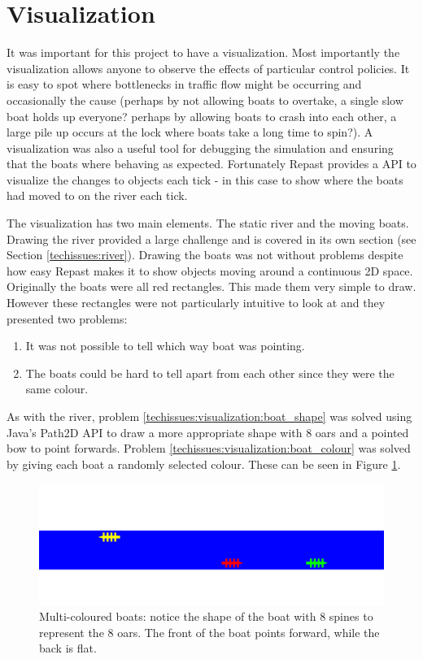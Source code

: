     \section{Visualization}
      It was important for this project to have a visualization. Most importantly the visualization allows anyone to observe the effects of particular control policies. It is easy to spot where bottlenecks in traffic flow might be occurring and occasionally the cause (perhaps by not allowing boats to overtake, a single slow boat holds up everyone? perhaps by allowing boats to crash into each other, a large pile up occurs at the lock where boats take a long time to spin?). A visualization was also a useful tool for debugging the simulation and ensuring that the boats where behaving as expected. Fortunately Repast provides a API to visualize the changes to objects each tick - in this case to show where the boats had moved to on the river each tick.

      The visualization has two main elements. The static river and the moving boats. Drawing the river provided a large challenge and is covered in its own section (see Section \ref{techissues:river}). Drawing the boats was not without problems despite how easy Repast makes it to show objects moving around a continuous 2D space. Originally the boats were all red rectangles. This made them very simple to draw. However these rectangles were not particularly intuitive to look at and they presented two problems:
      \begin{enumerate}
        \item \label{techissues:visualization:boat_shape} It was not possible to tell which way boat was pointing.
        \item \label{techissues:visualization:boat_colour} The boats could be hard to tell apart from each other since they were the same colour. 
      \end{enumerate}
      As with the river, problem \ref{techissues:visualization:boat_shape} was solved using Java's Path2D API to draw a more appropriate shape with 8 oars and a pointed bow to point forwards. Problem \ref{techissues:visualization:boat_colour} was solved by giving each boat a randomly selected colour. These can be seen in Figure \ref{techissues:fig:boats}.

      \begin{figure}
      \begin{center}
        \includegraphics[scale=0.8]{images/boats.png}
        \caption{Multi-coloured boats: notice the shape of the boat with 8 spines to represent the 8 oars. The front of the boat points forward, while the back is flat.}
        \label{techissues:fig:boats}
      \end{center}
      \end{figure}
  
